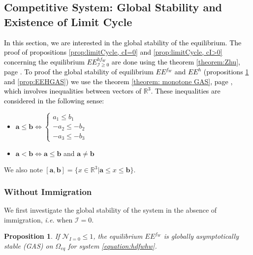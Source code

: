 \documentclass{article}
\newcommand{\cI}{\mathcal{I}}
\newcommand{\R}{\mathbb{R}}
\newcommand{\vdeux}[1]{\textcolor{black}{#1}}
\newtheorem{prop}[theorem]{Proposition}
\theoremstyle{definition}
\theoremstyle{remark}
\begin{document}
\subsection{Competitive System: Global Stability and Existence of Limit Cycle}
\vdeux{
In this section, we are interested in the global stability of the equilibrium. The proof of propositions \ref{prop:limitCycle, cI=0} and \ref{prop:limitCycle, cI>0} concerning the equilibrium $EE^{hf_W}_{\cI \geq 0}$ are done using the theorem \ref{theorem:Zhu}, page \pageref{theorem:Zhu}. To proof the global stability of equilibrium $EE^{f_W}$ and $EE^{h}$ (propositions \ref{prop:EEFGAS} and \ref{prop:EEHGAS}) we use the theorem \ref{theorem: monotone GAS}, page \pageref{theorem: monotone GAS}, which involves inequalities between vectors of $\R^3$. These inequalities are considered in the following sense:}
\begin{itemize}
\item $\mathbf{a} \leq \mathbf{b} \Leftrightarrow \left\lbrace \begin{array}{l} 
a_1 \leq b_1 \\ -a_2 \leq - b_2 \\ -a_3 \leq - b_3
\end{array} \right.$
\item $\mathbf{a} < \mathbf{b} \Leftrightarrow \mathbf{a} \leq \mathbf{b}$ and $\mathbf{a}\neq \mathbf{b}$
\end{itemize}
We also note $[\mathbf{a},\mathbf{b}] = \lbrace x \in \mathbb{R}^3 | \mathbf{a} \leq x \leq \mathbf{b} \rbrace$.


\subsubsection{Without Immigration}
We first investigate the global stability of the system in the absence of immigration, \textit{i.e.} when $\cI = 0$.
\begin{prop}\label{prop:EEFGAS}If $\mathcal{N}_{I =0} \leq 1
$, the equilibrium $EE^{f_W}$ is globally asymptotically stable (GAS) on $\Omega_{eq}$ for system \eqref{equation:hdfwhw}.
\end{prop}
\end{document}
